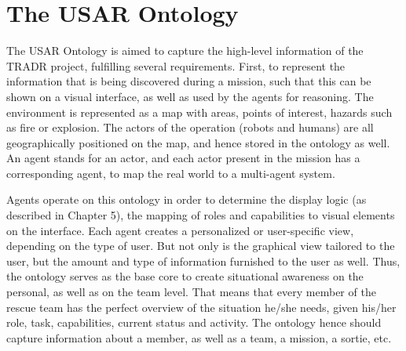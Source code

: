 \chapter{The USAR Ontology}
The USAR Ontology is aimed to capture the high-level information of the TRADR project, fulfilling several requirements. First, to represent the information that is being discovered during a mission, such that this can be shown on a visual interface, as well as used by the agents for reasoning. 
The environment is represented as a map with areas, points of interest, hazards such as fire or explosion. The actors of the operation (robots and humans) are all geographically positioned on the map, and hence stored in the ontology as well. An agent stands for an actor, and each actor present in the mission has a corresponding agent, to map the real world to a multi-agent system. 

Agents operate on this ontology in order to determine the display logic (as described in Chapter 5), the mapping of roles and capabilities to visual elements on the interface. Each agent creates a personalized or user-specific view, depending on the type of user. But not only is the graphical view tailored to the user, but the amount and type of information furnished to the user as well. Thus, the ontology serves as the base core to create situational awareness on the personal, as well as on the team level. That means that every member of the rescue team has the perfect overview of the situation he/she needs, given his/her role, task, capabilities, current status and activity. The ontology hence should capture information about a member, as well as a team, a mission, a sortie, etc.
 
